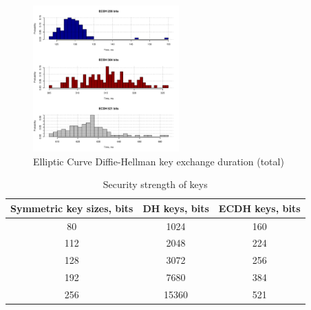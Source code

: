 \begin{figure}
	\includegraphics[width=0.5\textwidth]{graphics/ecdh_computation_hist.pdf}
	\caption{Elliptic Curve Diffie-Hellman key exchange duration (total)}
	\label{fig:ecdh}
\end{figure}

\begin{table}
\centering
\begin{tabular}{|c|c|c|}
\hline
\bf{Symmetric key sizes, bits} & \bf{DH keys, bits} & \bf{ECDH keys, bits} \\\hline
		80			&    1024                        & 160                                  \\
		112			&    2048                        & 224                                  \\
		128			&    3072                        & 256                                  \\
		192			&    7680                        & 384                                  \\
		256			&    15360                       & 521                                  \\
\hline
\end{tabular}
\caption{Security strength of keys}
\label{tab:strength}
\end{table}

